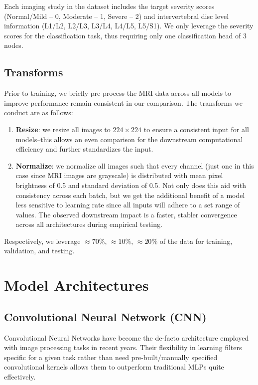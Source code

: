 \documentclass[conference]{IEEEtran}
\begin{document}
Each imaging study in the dataset includes the target severity scores (Normal/Mild -- 0, Moderate -- 1, Severe -- 2) and intervertebral disc level information (L1/L2, L2/L3, L3/L4, L4/L5, L5/S1). We only leverage the severity scores for the classification task, thus requiring only one classification head of 3 nodes.

\subsection{Transforms}
Prior to training, we briefly pre-process the MRI data across all models to improve performance remain consistent in our comparison. The transforms we conduct are as follows:
\begin{enumerate}
    \item \textbf{Resize}: we resize all images to $224 \times 224$ to ensure a consistent input for all models--this allows an even comparison for the downstream computational efficiency and further standardizes the input.

    \item \textbf{Normalize}: we normalize all images such that every channel (just one in this case since MRI images are grayscale) is distributed with mean pixel brightness of 0.5 and standard deviation of 0.5. Not only does this aid with consistency across each batch, but we get the additional benefit of a model less sensitive to learning rate since all inputs will adhere to a set range of values. The observed downstream impact is a faster, stabler convergence across all architectures during empirical testing.
\end{enumerate}

Respectively, we leverage $\approx 70\%$, $\approx 10\%$, $\approx 20\%$ of the data for training, validation, and testing.


\section{Model Architectures}
\subsection{Convolutional Neural Network (CNN)} \label{sec:CNN}
Convolutional Neural Networks have become the de-facto architecture employed with image processing tasks in recent years. Their flexibility in learning filters specific for a given task rather than need pre-built/manually specified convolutional kernels allows them to outperform traditional MLPs quite effectively.
\end{document}
